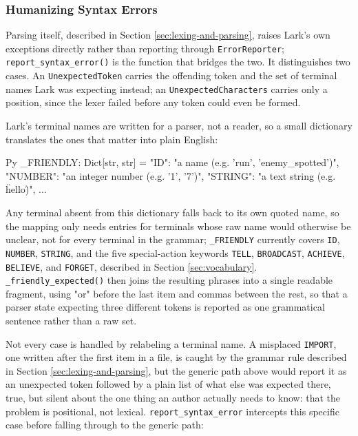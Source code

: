 \subsubsection{Humanizing Syntax Errors}
Parsing itself, described in Section \ref{sec:lexing-and-parsing}, raises Lark's own exceptions directly rather than reporting through \lstinline|ErrorReporter|; \lstinline|report_syntax_error()| is the function that bridges the two. It distinguishes two cases. An \lstinline|UnexpectedToken| carries the offending token and the set of terminal names Lark was expecting instead; an \lstinline|UnexpectedCharacters| carries only a position, since the lexer failed before any token could even be formed.

Lark's terminal names are written for a parser, not a reader, so a small dictionary translates the ones that matter into plain English:
\begin{codeblock}[]{Py}
_FRIENDLY: Dict[str, str] = {
    "ID":     "a name (e.g. 'run', 'enemy_spotted')",
    "NUMBER": "an integer number (e.g. '1', '7')",
    "STRING": "a text string (e.g. \"hello\")",
    ...
}
\end{codeblock}
Any terminal absent from this dictionary falls back to its own quoted name, so the mapping only needs entries for terminals whose raw name would otherwise be unclear, not for every terminal in the grammar; \lstinline|_FRIENDLY| currently covers \lstinline|ID|, \lstinline|NUMBER|, \lstinline|STRING|, and the five special-action keywords \lstinline|TELL|, \lstinline|BROADCAST|, \lstinline|ACHIEVE|, \lstinline|BELIEVE|, and \lstinline|FORGET|, described in Section \ref{sec:vocabulary}. \lstinline|_friendly_expected()| then joins the resulting phrases into a single readable fragment, using "or" before the last item and commas between the rest, so that a parser state expecting three different tokens is reported as one grammatical sentence rather than a raw set.

Not every case is handled by relabeling a terminal name. A misplaced \lstinline|IMPORT|, one written after the first item in a file, is caught by the grammar rule described in Section \ref{sec:lexing-and-parsing}, but the generic path above would report it as an unexpected token followed by a plain list of what else was expected there, true, but silent about the one thing an author actually needs to know: that the problem is positional, not lexical. \lstinline|report_syntax_error| intercepts this specific case before falling through to the generic path:

